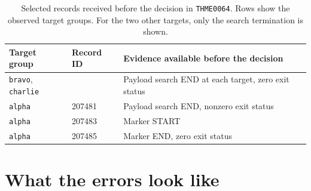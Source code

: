 \begin{table}[htbp]
\centering
\caption[Selected records received before the decision in \texttt{THME0064}]{Selected records received before the decision in
\texttt{THME0064}. Rows show the observed target groups. For the
two other targets, only the search termination is shown.}
\label{tab:recorded-case}
\begin{tabularx}{\textwidth}{@{}llX@{}}
\toprule
Target group & Record ID & Evidence available before the decision \\
\midrule
\texttt{bravo}, \texttt{charlie} & & Payload search END at each target, zero exit status \\
\texttt{alpha} & 207481 & Payload search END, nonzero exit status \\
\texttt{alpha} & 207483 & Marker START \\
\texttt{alpha} & 207485 & Marker END, zero exit status \\
\bottomrule
\end{tabularx}
\end{table}

\section{What the errors look like}
\label{sec:diag-errors}

